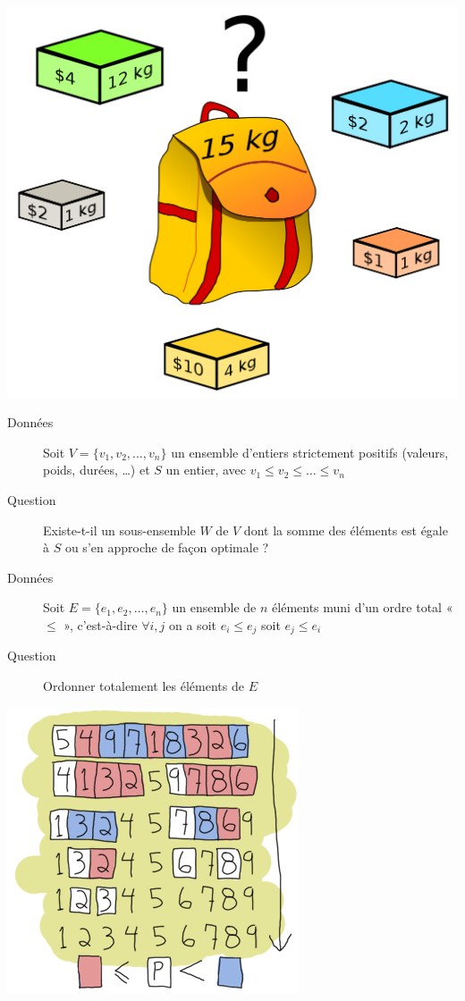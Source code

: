 \documentclass[aspectratio=1610,francais,envcountsect]{beamer}
\begin{document}
\begin{frame}[allowframebreaks]
  \begin{center}
    \includegraphics[width=0.3\columnwidth]{knapsack.png}
  \end{center}

  \framebreak

  \begin{definition}

    \begin{description}
    \item [Données] Soit $V = \{ v_1, v_2, \ldots , v_n\}$ un ensemble
      d’entiers strictement positifs (valeurs, poids, durées, \ldots)
      et $S$ un entier, avec $v_1 \leq v_2 \leq \ldots \leq v_n$
    \item [Question] Existe-t-il un sous-ensemble $W$ de $V$ dont la
      somme des éléments est égale à $S$ ou s’en approche de façon
      optimale ?
    \end{description}
  \end{definition}

  \framebreak

  \begin{definition}
    \begin{description}
    \item [Données] Soit $E = \{e_1, e_2,\ldots , e_n\}$ un ensemble
      de $n$ éléments muni d’un ordre total « $\leq$ », c’est-à-dire
      $\forall i, j$ on a soit $e_i \leq e_j$ soit $e_j \leq e_i$
    \item [Question] Ordonner totalement les éléments de $E$
    \end{description}

  \end{definition}


  \begin{center}
    \includegraphics[width=0.3\columnwidth]{quicksort.png}
  \end{center}

\end{frame}
\end{document}
